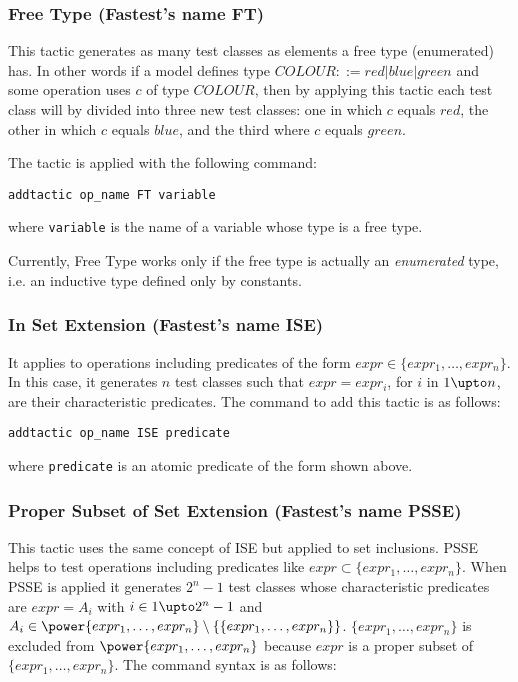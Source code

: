 \subsubsection{Free Type (Fastest's name FT)}
This tactic generates as many test classes as elements a free type (enumerated) has. In other words if a model defines type $COLOUR ::= red | blue | green$ and some operation uses $c$ of type $COLOUR$, then by applying this tactic each test class will by divided into three new test classes: one in which $c$ equals $red$, the other in which $c$ equals $blue$, and the third where $c$ equals $green$.

The tactic is applied with the following command:

\begin{verbatim}
addtactic op_name FT variable
\end{verbatim}

\noindent where \verb+variable+ is the name of a variable whose type is a free type.

Currently, Free Type works only if the free type is actually an {\it enumerated} type, i.e. an inductive type defined only by constants.

\subsubsection{In Set Extension (Fastest's name ISE)}
It applies to operations including predicates of the form $expr \in \{expr_{1}, \dots, expr_{n}\}$. In this case, it generates $n$ test classes such that $expr = expr_{i}$, for $i$ in $1 \upto n$, are their characteristic predicates. The command to add this tactic is as follows:

\begin{verbatim}
addtactic op_name ISE predicate
\end{verbatim}

\noindent where \verb+predicate+ is an atomic predicate of the form shown above.

\subsubsection{Proper Subset of Set Extension (Fastest's name PSSE)}
This tactic uses the same concept of ISE but applied to set inclusions. PSSE helps to test operations including predicates like $expr \subset \{expr_{1}, \dots, expr_{n}\}$. When PSSE is applied it generates $2^{n} - 1$ test classes whose characteristic predicates are $expr = A_{i}$ with $i \in 1 \upto 2^{n} -1$ and $A_{i} \in \power \{expr_{1}, \dots, expr_{n}\} \setminus \{\{expr_{1}, \dots, expr_{n}\}\}$. $\{expr_{1}, \dots, expr_{n}\}$ is excluded from $\power \{expr_{1}, \dots, expr_{n}\}$ because $expr$ is a proper subset of $\{expr_{1}, \dots, expr_{n}\}$. The command syntax is as follows:

